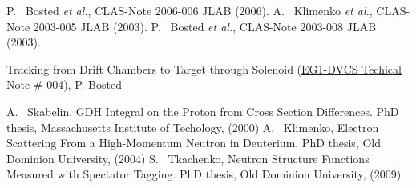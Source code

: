  P. ~Bosted {\em et al.}, CLAS-Note 2006-006 JLAB (2006). %
 A. ~Klimenko {\em et al.}, CLAS-Note 2003-005 JLAB (2003).
 P. ~Bosted {\em et al.}, CLAS-Note 2003-008 JLAB (2003).


Tracking from Drift Chambers to Target through
Solenoid (\href{https://www.jlab.org/Hall-B/secure/eg1-dvcs/technotes/targetinfo/target_info.pdf}{EG1-DVCS Techical Note \#{} 004}),
P. Bosted



 A. ~Skabelin, GDH Integral on the Proton from Cross Section Differences. %
PhD thesis, Massachusetts Institute of Techology, (2000)
 A. ~Klimenko, Electron Scattering From a High-Momentum Neutron in Deuterium. PhD
thesis, Old Dominion University, (2004)
 S. ~Tkachenko, Neutron Structure Functions Measured with Spectator Tagging. PhD thesis, 
Old Dominion University, (2009)


